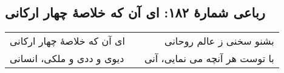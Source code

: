 \begin{center}
\section*{رباعی شمارهٔ ۱۸۲: ای آن که خلاصۀ چهار ارکانی}
\label{sec:182}
\begin{longtable}{l p{0.5cm} r}
ای آن که خلاصهٔ چهار ارکانی
&&
بشنو سخنی ز عالم روحانی
\\
دیوی و ددی و ملکی، انسانی
&&
با توست هر آنچه می نمایی، آنی
\\
\end{longtable}
\end{center}
